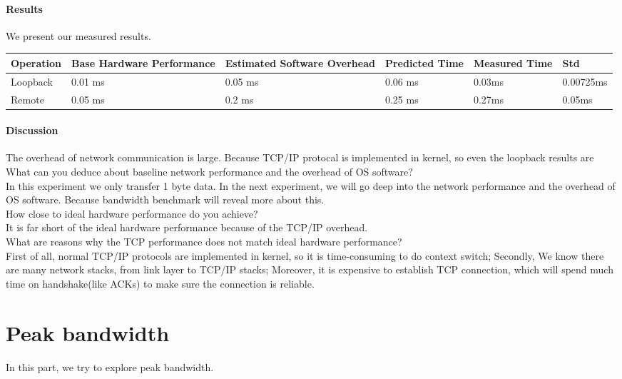 \paragraph{Results}
We present our measured results.

\begin{center}
\begin{tabular}{| p{2cm} | p{3cm} | p{3cm} | p{2.5cm} | p{2.5cm} | p{2cm}}
Operation   & Base Hardware Performance  & Estimated Software Overhead  & Predicted Time  & Measured Time  & Std \\
\hline
Loopback  & 0.01 ms& 0.05 ms& 0.06 ms & 0.03ms & 0.00725ms \\
Remote  & 0.05 ms& 0.2 ms & 0.25 ms & 0.27ms & 0.05ms \\ 
\end{tabular}
\end{center}

\paragraph{Discussion}
The overhead of network communication is large.
Because TCP/IP protocal is implemented in kernel, so even the loopback results are \\

What can you deduce about baseline network performance and the overhead of OS software?  \\
In this experiment we only transfer 1 byte data. In the next experiment, we will go deep into the network performance and the overhead of OS software. Because bandwidth benchmark will reveal more about this. \\

How close to ideal hardware performance do you achieve? \\
It is far short of the ideal hardware performance because of the TCP/IP overhead.\\


What are reasons why the TCP performance does not match ideal hardware performance?  \\
First of all, normal TCP/IP protocols are implemented in kernel, so it is time-consuming to do context switch;
Secondly, We know there are many network stacks, from link layer to TCP/IP stacks;
Moreover, it is expensive to establish TCP connection, which will spend much time on handshake(like ACKs) to make sure the connection is reliable.

\section{Peak bandwidth}
In this part, we try to explore peak bandwidth.

